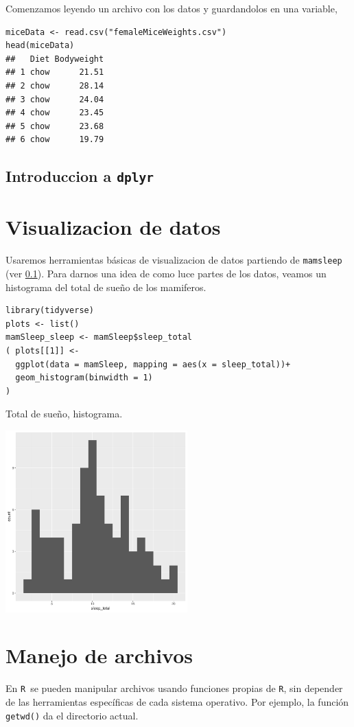 \documentclass[fleqn,leqno,draft,10pt]{article}
\newcommand{\R}{\texttt{R}}
\begin{document}
Comenzamos leyendo un archivo con los datos y guardandolos en una variable,
\begin{lstlisting}
miceData <- read.csv("femaleMiceWeights.csv")
head(miceData)
##   Diet Bodyweight
## 1 chow      21.51
## 2 chow      28.14
## 3 chow      24.04
## 4 chow      23.45
## 5 chow      23.68
## 6 chow      19.79
\end{lstlisting}

\subsection{Introduccion a \lstinline|dplyr|}%
\label{sub:Introduccion a dplyr}


\section{Visualizacion de datos}%
\label{sec:Visualizacion}

Usaremos herramientas básicas de visualizacion de datos partiendo de \lstinline|mamsleep| (ver \cref{sub:Introduccion a dplyr}). Para darnos una idea de como luce partes de los datos, veamos un histograma del total de sueño de los mamiferos.%
\begin{lstlisting}
library(tidyverse)
plots <- list()
mamSleep_sleep <- mamSleep$sleep_total
( plots[[1]] <- 
  ggplot(data = mamSleep, mapping = aes(x = sleep_total))+ 
  geom_histogram(binwidth = 1)
)
\end{lstlisting}

\begin{marginfigure}\caption{Total de sueño, histograma.}
	\includegraphics[width=7cm,page=1]{pics/all.pdf}	
\end{marginfigure}

\appendix
\section{Manejo de archivos}%
\label{sec:Manejo de archivos}

En \R\ se pueden manipular archivos usando funciones propias de \R, sin depender de las herramientas específicas de cada sistema operativo. Por ejemplo, la función \lstinline|getwd()| da el directorio actual.


\end{document}
